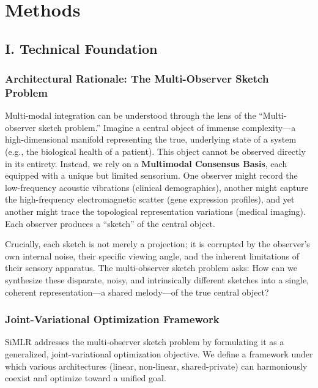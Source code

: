 \documentclass[
  letterpaper,
]{report}
\begin{document}

\chapter{Methods}\label{methods}

\section{I. Technical Foundation}\label{i.-technical-foundation}

\subsection{Architectural Rationale: The Multi-Observer Sketch
Problem}\label{architectural-rationale-the-multi-observer-sketch-problem}

Multi-modal integration can be understood through the lens of the
``Multi-observer sketch problem.'' Imagine a central object of immense
complexity---a high-dimensional manifold representing the true,
underlying state of a system (e.g., the biological health of a patient).
This object cannot be observed directly in its entirety. Instead, we
rely on a \textbf{Multimodal Consensus Basis}, each equipped with a
unique but limited sensorium. One observer might record the
low-frequency acoustic vibrations (clinical demographics), another might
capture the high-frequency electromagnetic scatter (gene expression
profiles), and yet another might trace the topological representation
variations (medical imaging). Each observer produces a ``sketch'' of the
central object.

Crucially, each sketch is not merely a projection; it is corrupted by
the observer's own internal noise, their specific viewing angle, and the
inherent limitations of their sensory apparatus. The multi-observer
sketch problem asks: How can we synthesize these disparate, noisy, and
intrinsically different sketches into a single, coherent
representation---a shared melody---of the true central object?

\subsection{Joint-Variational Optimization
Framework}\label{joint-variational-optimization-framework}

SiMLR addresses the multi-observer sketch problem by formulating it as a
generalized, joint-variational optimization objective. We define a
framework under which various architectures (linear, non-linear,
shared-private) can harmoniously coexist and optimize toward a unified
goal.
\end{document}
